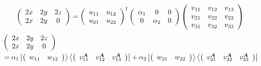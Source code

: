 \documentclass[aps,preprint]{revtex4}%
\begin{document}
\begin{equation}
\left(
\begin{array}
[c]{ccc}%
2x & 2y & 2z\\
2x & 2y & 0
\end{array}
\right)  =\left(
\begin{array}
[c]{cc}%
u_{11} & u_{12}\\
u_{21} & u_{22}%
\end{array}
\right)  ^{\dagger}\left(
\begin{array}
[c]{ccc}%
\alpha_{1} & 0 & 0\\
0 & \alpha_{2} & 0
\end{array}
\right)  \left(
\begin{array}
[c]{ccc}%
v_{11} & v_{12} & v_{13}\\
v_{21} & v_{22} & v_{23}\\
v_{31} & v_{32} & v_{33}%
\end{array}
\right)
\end{equation}%
\begin{align}
&  \left(
\begin{array}
[c]{ccc}%
2x & 2y & 2z\\
2x & 2y & 0
\end{array}
\right) \nonumber\\
&  =\alpha_{1}\left\vert \left(
\begin{array}
[c]{cc}%
w_{11} & w_{12}%
\end{array}
\right)  \right\rangle \left\langle \left(
\begin{array}
[c]{ccc}%
v_{11}^{\boldsymbol{A}} & v_{12}^{\boldsymbol{A}} & v_{13}^{\boldsymbol{A}}%
\end{array}
\right)  \right\vert +\alpha_{2}\left\vert \left(
\begin{array}
[c]{cc}%
w_{21} & w_{22}%
\end{array}
\right)  \right\rangle \left\langle \left(
\begin{array}
[c]{ccc}%
v_{21}^{\boldsymbol{A}} & v_{22}^{\boldsymbol{A}} & v_{23}^{\boldsymbol{A}}%
\end{array}
\right)  \right\vert
\end{align}%
\end{document}
